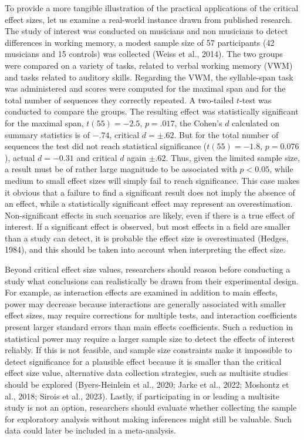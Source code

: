 \documentclass[
  man,floatsintext]{apa7}
\begin{document}
To provide a more tangible illustration of the practical applications of the critical effect sizes, let us examine a real-world instance drawn from published research. The study of interest was conducted on musicians and non musicians to detect differences in working memory, a modest sample size of 57 participants (42 musicians and 15 controls) was collected (Weiss et al., 2014). The two groups were compared on a variety of tasks, related to verbal working memory (VWM) and tasks related to auditory skills. Regarding the VWM, the syllable-span task was administered and scores were computed for the maximal span and for the total number of sequences they correctly repeated. A two-tailed \(t\)-test was conducted to compare the groups. The resulting effect was statistically significant for the maximal span, \(t(55) = -2.5\), \(p = .017\), the Cohen's \(d\) calculated on summary statistics is of \(-.74\), critical \(d = \pm .62\). But for the total number of sequences the test did not reach statistical significance (\(t(55) = -1.8\), \(p = 0.076\)), actual \(d = -0.31\) and critical \(d\) again \(\pm.62\). Thus, given the limited sample size, a result must be of rather large magnitude to be associated with \(p < 0.05\), while medium to small effect sizes will simply fail to reach significance. This case makes it obvious that a failure to find a significant result does not imply the absence of an effect, while a statistically significant effect may represent an overestimation. Non-significant effects in such scenarios are likely, even if there is a true effect of interest. If a significant effect is observed, but most effects in a field are smaller than a study can detect, it is probable the effect size is overestimated (Hedges, 1984), and this should be taken into account when interpreting the effect size.

Beyond critical effect size values, researchers should reason before conducting a study what conclusions can realistically be drawn from their experimental design. For example, as interaction effects are examined in addition to main effects, power may decrease because interactions are generally associated with smaller effect sizes, may require corrections for multiple tests, and interaction coefficients present larger standard errors than main effects coefficients. Such a reduction in statistical power may require a larger sample size to detect the effects of interest reliably. If this is not feasible, and sample size constraints make it impossible to detect significance for a plausible effect because it is smaller than the critical effect size value, alternative data collection strategies, such as multisite studies should be explored (Byers-Heinlein et al., 2020; Jarke et al., 2022; Moshontz et al., 2018; Sirois et al., 2023). Lastly, if participating in or leading a multisite study is not an option, researchers should evaluate whether collecting the sample for exploratory analysis without making inferences might still be valuable. Such data could later be included in a meta-analysis.
\end{document}
